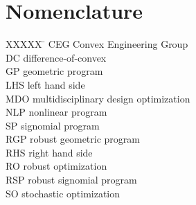 \section*{Nomenclature}

\begin{tabbing}
  XXXXX \= \kill%
  CEG \> Convex Engineering Group \\
  DC \> difference-of-convex \\
  GP \> geometric program \\
  LHS \> left hand side \\
  MDO \> multidisciplinary design optimization \\
  NLP \> nonlinear program \\
  SP \> signomial program \\
  RGP \> robust geometric program \\
  RHS \> right hand side \\
  RO \> robust optimization \\
  RSP \> robust signomial program \\
  SO \> stochastic optimization \\
 \end{tabbing}
